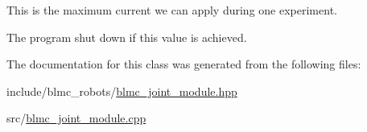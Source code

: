 This is the maximum current we can apply during one experiment. 

The program shut down if this value is achieved. 

The documentation for this class was generated from the following files\+:\begin{DoxyCompactItemize}
\item 
include/blmc\+\_\+robots/\hyperlink{blmc__joint__module_8hpp}{blmc\+\_\+joint\+\_\+module.\+hpp}\item 
src/\hyperlink{blmc__joint__module_8cpp}{blmc\+\_\+joint\+\_\+module.\+cpp}\end{DoxyCompactItemize}
